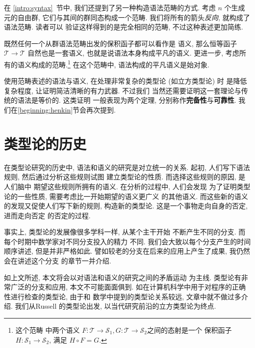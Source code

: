 在 \ref{intro:syntax}~节中, 我们还提到了另一种构造语法范畴的方式.
考虑 \(n\) 个生成元的自由群, 它们与其间的群同态构成一个范畴.
我们将所有的箭头\emph{反向}, 就构成了语法范畴. 读者可以
验证这样得到的是完全相同的范畴, 不过这种表述更加简练.

既然任何一个从群语法范畴出发的保积函子都可以看作是
语义, 那么恒等函子 \(\mathcal T \to \mathcal T\)
自然也是一套语义, 也就是说语法本身构成平凡的语义.
更进一步, 考虑所有的语义构成的范畴.\footnote{这个范畴
中两个语义 \(F : \mathcal T \to \mathcal S_1,
G : \mathcal T \to \mathcal S_2\)之间的态射是一个
保积函子 \(H : \mathcal S_1 \to \mathcal S_2\),
满足 \(H \circ F = G\).}
在这个范畴中, 语法构成的平凡语义是始对象.

使用范畴表述的语法与语义, 在处理非常复杂的类型论 (如立方类型论) 时
是降低复杂程度, 让证明简洁清晰的有力武器. 不过我们
当然还需要证明这一套理论与传统的语法是等价的. 这类证明
一般表现为两个定理, 分别称作\textbf{完备性}与\textbf{可靠性}.
我们在\ref{beginning:henkin}节会再次提到.


\section{类型论的历史}\label{intro:unity}
在类型论研究的历史中, 语法和语义的研究是对立统一的关系.
起初, 人们写下语法规则, 然后通过分析这些规则试图
建立类型论的性质. 而选择这些规则的原因, 是人们脑中
期望这些规则所拥有的语义. 在分析的过程中, 人们会发现
为了证明类型论的一些性质, 需要考虑比一开始期望的语义更广义
的其他语义. 而这些新的语义的发现又促使人们写下新的规则,
构造新的类型论. 这是一个事物走向自身的否定, 进而走向否定
的否定的过程.

事实上, 类型论的发展像很多学科一样, 从某个主干开始
不断产生不同的分支. 而每个时期中数学家对不同分支投入的精力
不同. 我们会大致以每个分支产生的时间顺序讲述, 但是并非严格如此.
譬如较老的分支在后来的应用上产生了成果, 我仍然会在讲述这个分支
的章节一并介绍.

如上文所述, 本文将会以对语法和语义的研究之间的矛盾运动
为主线. 类型论有非常广泛的分支和应用, 本文不可能面面俱到.
如在计算机科学中用于对程序的正确性进行检查的类型论, 由于和
数学中提到的类型论关系较远, 文章中就不做过多介绍. 我们从Russell
的类型论出发, 以当代研究前沿的立方类型论为终点.
